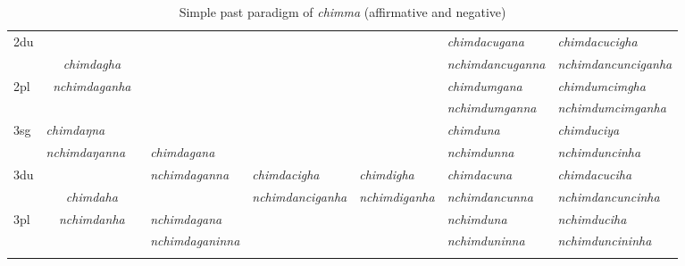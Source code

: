 \begin{sidewaystable}[p]
{\begin{tabular}{|l||p{2.4cm}|p{2.0cm}|p{2.6cm}|p{2.6cm}|p{2.6cm}|p{3.2cm}|p{3.2cm}|}
 \cline{1-2} \cline{7-8}			
{\sc 2du}		& \multicolumn{2}{c|}{}     &  \multicolumn{3}{c|}{\cellcolor[gray]{.8}} & \it  chimdacugana  & \it   chimdacucigha \\
		&  	\multicolumn{2}{c|}{\it chimdagha} & \multicolumn{3}{c|}{ \cellcolor[gray]{.8}}& \it nchimdancuganna  & \it  nchimdancunciganha \\
 \cline{1-1} \cline{7-8}			
{\sc 2pl}		& 	\multicolumn{2}{c|}{\it nchimdaganha} &  \multicolumn{3}{c|}{ \cellcolor[gray]{.8}}& \it  chimdumgana& \it  chimdumcimgha  \\
		& \multicolumn{2}{c|}{ }&  \multicolumn{3}{c|}{\cellcolor[gray]{.8} }& \it  nchimdumganna & \it  nchimdumcimganha \\
\hline			
{\sc 3sg} 		& \it chimdaŋna	  & \it 	      	& \it   			& \it     & \it     	& \it chimduna& \it chimduciya\\
		& \it  nchimdaŋanna   & \it    	& \it  chimdagana	& \it   & \it    & \it nchimdunna& \it nchimduncinha\\
  \cline{1-2}  \cline{7-8}					
{\sc 3du}&   \multicolumn{2}{c|}{}& \it nchimdaganna& \it  chimdacigha& \it chimdigha& \it   chimdacuna & \it   chimdacuciha\\
	& \multicolumn{2}{c|}{\it chimdaha}& \it  & \it nchimdanciganha& \it  nchimdiganha & \it  nchimdancunna & \it  nchimdancuncinha\\
 \cline{1-1} \cline{4-4} \cline{7-8}	
{\sc 3pl} &  \multicolumn{2}{c|}{\it nchimdanha}	& \it nchimdagana& \it  & \it  & \it nchimduna& \it nchimduciha\\	
	& \multicolumn{2}{c|}{ }& \it nchimdaganinna& \it & \it  & \it nchimduninna& \it nchimduncininha \\
\lspbottomrule
\end{tabular}
}
\caption{Simple past paradigm of \emph{chimma}  (affirmative and negative)}\label{par-chimd-pst}
\end{sidewaystable}



